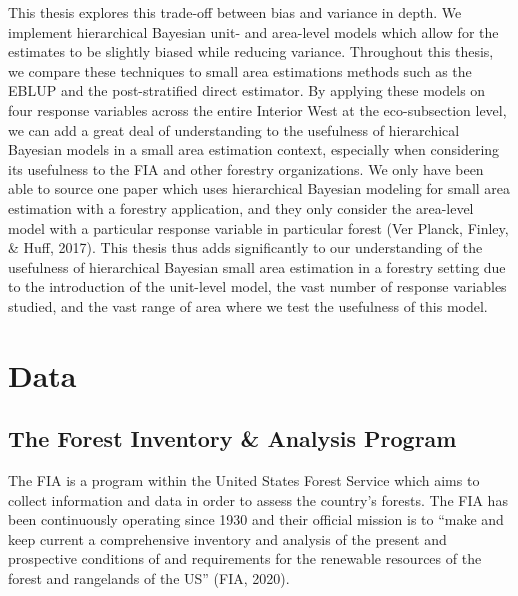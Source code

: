 \documentclass[12pt,twoside]{reedthesis}
\begin{document}
This thesis explores this trade-off between bias and variance in depth. We implement hierarchical Bayesian unit- and area-level models which allow for the estimates to be slightly biased while reducing variance. Throughout this thesis, we compare these techniques to small area estimations methods such as the EBLUP and the post-stratified direct estimator. By applying these models on four response variables across the entire Interior West at the eco-subsection level, we can add a great deal of understanding to the usefulness of hierarchical Bayesian models in a small area estimation context, especially when considering its usefulness to the FIA and other forestry organizations. We only have been able to source one paper which uses hierarchical Bayesian modeling for small area estimation with a forestry application, and they only consider the area-level model with a particular response variable in particular forest (Ver Planck, Finley, \& Huff, 2017). This thesis thus adds significantly to our understanding of the usefulness of hierarchical Bayesian small area estimation in a forestry setting due to the introduction of the unit-level model, the vast number of response variables studied, and the vast range of area where we test the usefulness of this model.

\hypertarget{data}{%
\chapter{Data}\label{data}}

\hypertarget{the-forest-inventory-analysis-program}{%
\section{The Forest Inventory \& Analysis Program}\label{the-forest-inventory-analysis-program}}

The FIA is a program within the United States Forest Service which aims to collect information and data in order to assess the country's forests. The FIA has been continuously operating since 1930 and their official mission is to ``make and keep current a comprehensive inventory and analysis of the present and prospective conditions of and requirements for the renewable resources of the forest and rangelands of the US'' (FIA, 2020).
\end{document}
